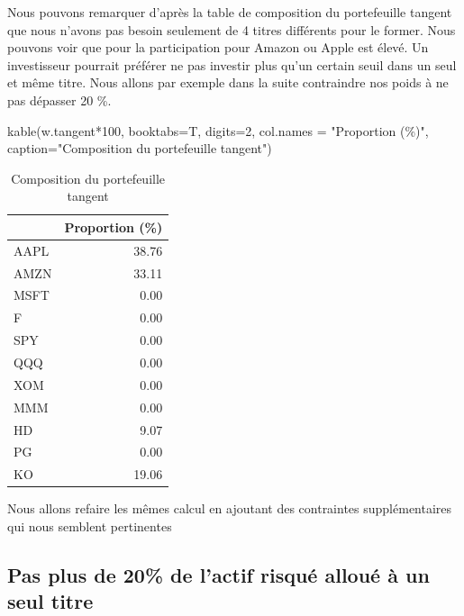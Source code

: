 \documentclass[
]{article}
\newenvironment{Shaded}{\begin{snugshade}}{\end{snugshade}}
\newcommand{\AttributeTok}[1]{\textcolor[rgb]{0.77,0.63,0.00}{#1}}
\newcommand{\DecValTok}[1]{\textcolor[rgb]{0.00,0.00,0.81}{#1}}
\newcommand{\FunctionTok}[1]{\textcolor[rgb]{0.00,0.00,0.00}{#1}}
\newcommand{\NormalTok}[1]{#1}
\newcommand{\SpecialCharTok}[1]{\textcolor[rgb]{0.00,0.00,0.00}{#1}}
\newcommand{\StringTok}[1]{\textcolor[rgb]{0.31,0.60,0.02}{#1}}
\begin{document}
Nous pouvons remarquer d'après la table de composition du portefeuille
tangent que nous n'avons pas besoin seulement de 4 titres différents
pour le former. Nous pouvons voir que pour la participation pour Amazon
ou Apple est élevé. Un investisseur pourrait préférer ne pas investir
plus qu'un certain seuil dans un seul et même titre. Nous allons par
exemple dans la suite contraindre nos poids à ne pas dépasser 20 \%.

\begin{Shaded}
\begin{Highlighting}[]
\FunctionTok{kable}\NormalTok{(w.tangent}\SpecialCharTok{*}\DecValTok{100}\NormalTok{, }\AttributeTok{booktabs=}\NormalTok{T, }\AttributeTok{digits=}\DecValTok{2}\NormalTok{, }\AttributeTok{col.names =} \StringTok{"Proportion (\%)"}\NormalTok{,}
      \AttributeTok{caption=}\StringTok{"Composition du portefeuille tangent"}\NormalTok{)}
\end{Highlighting}
\end{Shaded}

\begin{table}

\caption{\label{tab:unnamed-chunk-10}Composition du portefeuille tangent}
\centering
\begin{tabular}[t]{lr}
\toprule
  & Proportion (\%)\\
\midrule
AAPL & 38.76\\
AMZN & 33.11\\
MSFT & 0.00\\
F & 0.00\\
SPY & 0.00\\
\addlinespace
QQQ & 0.00\\
XOM & 0.00\\
MMM & 0.00\\
HD & 9.07\\
PG & 0.00\\
\addlinespace
KO & 19.06\\
\bottomrule
\end{tabular}
\end{table}

Nous allons refaire les mêmes calcul en ajoutant des contraintes
supplémentaires qui nous semblent pertinentes

\hypertarget{pas-plus-de-20-de-lactif-risquuxe9-allouuxe9-uxe0-un-seul-titre}{%
\subsection{Pas plus de 20\% de l'actif risqué alloué à un seul
titre}\label{pas-plus-de-20-de-lactif-risquuxe9-allouuxe9-uxe0-un-seul-titre}}
\end{document}
